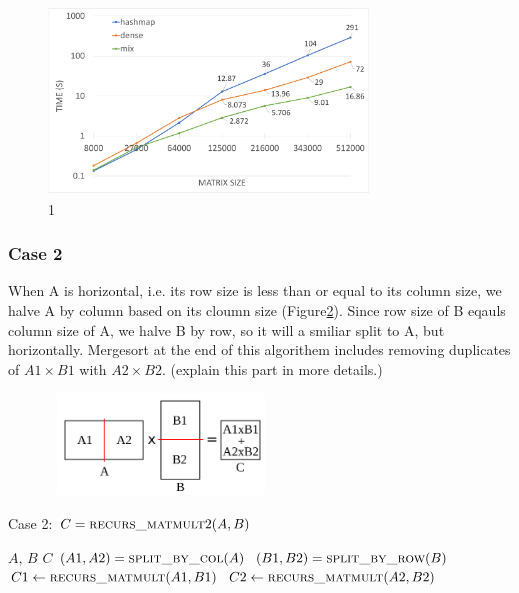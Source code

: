\begin{figure}[tbh]
 \centering
 \includegraphics[width=8.5cm,height=5cm]{./figures/mix.pdf}
 \caption{1}
 \label{fig:mix}
\end{figure}


\subsubsection{Case 2}
\label{sec:case2}
When A is horizontal, i.e. its row size is less than or equal to its column size, we halve A by column based on its cloumn size (Figure\ref{fig:case2}). Since row size of B eqauls column size of A, we halve B by row, so it will a smiliar split to A, but horizontally. Mergesort at the end of this algorithem includes removing duplicates of $A1 \times B1$ with $A2 \times B2$. (explain this part in more details.)

\begin{figure}[tbh]
 \centering
 \includegraphics[width=6cm,height=2.7cm]{./figures/case2_001.pdf}
 \caption{}
 \label{fig:case2}
\end{figure}

\begin{algorithm}[H] 
  \caption{Case 2: $C = \textsc{recurs\_matmult}2(A, B)$} \label{alg:case2} 
  \begin{algorithmic}[1]
    \Require $A$, $B$
    \Ensure  $C$
    \State $(A1, A2) = \textsc{split\_by\_col}(A)$
    \State $(B1, B2) = \textsc{split\_by\_row}(B)$
    \State $C1 \leftarrow \textsc{recurs\_matmult}(A1,B1)$
    \State $C2 \leftarrow \textsc{recurs\_matmult}(A2,B2)$
  \end{algorithmic}
\end{algorithm}

